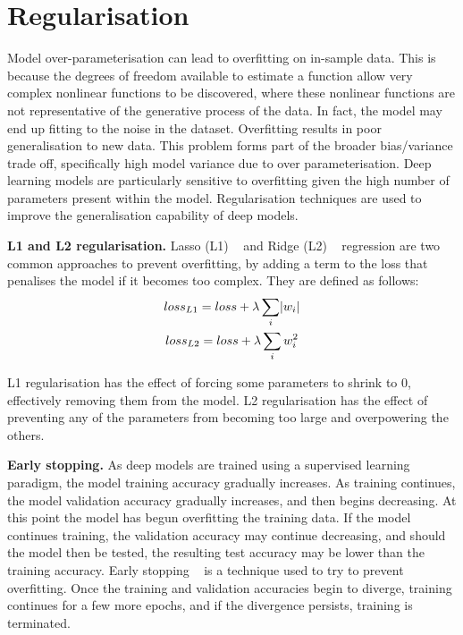 
\section{Regularisation}

Model over-parameterisation can lead to overfitting on in-sample data. This is because the degrees of freedom available to estimate a function allow very complex nonlinear functions to be discovered, where these nonlinear functions are not representative of the generative process of the data. In fact, the model may end up fitting to the noise in the dataset. Overfitting results in poor generalisation to new data. This problem forms part of the broader bias/variance trade off, specifically high model variance due to over parameterisation. Deep learning models are particularly sensitive to overfitting given the high number of parameters present within the model. Regularisation techniques are used to improve the generalisation capability of deep models. \par

\noindent \textbf{L1 and L2 regularisation.} Lasso (L1) \unskip ~\citep{tibshirani1996regression} and Ridge (L2) \unskip ~\citep{hoerl1970ridge} regression are two common approaches to prevent overfitting, by adding a term to the loss that penalises the model if it becomes too complex. They are defined as follows:
\begin{subequations}
	\begin{gather}
		loss_{L1} = loss + \lambda\sum_i\abs{w_i}  \\
		loss_{L2} = loss + \lambda\sum_iw_i^2
	\end{gather}
\end{subequations}

\noindent L1 regularisation has the effect of forcing some parameters to shrink to 0, effectively removing them from the model. L2 regularisation has the effect of preventing any of the parameters from becoming too large and overpowering the others. \par

\noindent \textbf{Early stopping.} As deep models are trained using a supervised learning paradigm, the model training accuracy gradually increases. As training continues, the model validation accuracy gradually increases, and then begins decreasing. At this point the model has begun overfitting the training data. If the model continues training, the validation accuracy may continue decreasing, and should the model then be tested, the resulting test accuracy may be lower than the training accuracy. Early stopping \unskip ~\citep{prechelt1998early} is a technique used to try to prevent overfitting. Once the training and validation accuracies begin to diverge, training continues for a few more epochs, and if the divergence persists, training is terminated. \par

